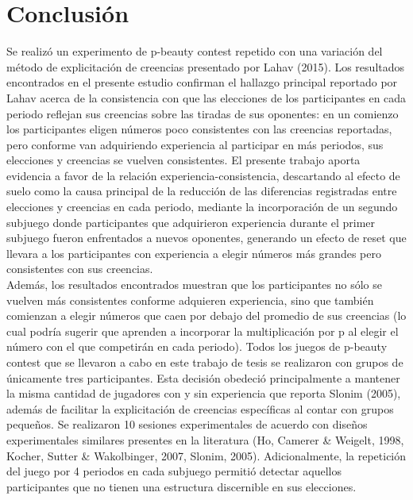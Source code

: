 
\chapter{Conclusión} %

\label{Cap_Conclusion} %
Se realizó un experimento de p-beauty contest repetido con una variación del método de explicitación de creencias presentado por Lahav (2015). Los resultados encontrados en el presente estudio confirman el hallazgo principal reportado por Lahav acerca de la consistencia con que las elecciones de los participantes en cada periodo reflejan sus creencias sobre las tiradas de sus oponentes: en un comienzo los participantes eligen números poco consistentes con las creencias reportadas, pero conforme van adquiriendo experiencia al participar en más periodos, sus elecciones y creencias se vuelven consistentes. El presente trabajo aporta evidencia a favor de la relación experiencia-consistencia, descartando al efecto de suelo como la causa principal de la reducción de las diferencias registradas entre elecciones y creencias en cada periodo, mediante la incorporación de un segundo subjuego donde participantes que adquirieron experiencia durante el primer subjuego fueron enfrentados a nuevos oponentes, generando un efecto de reset que llevara a los participantes con experiencia a elegir números más grandes pero consistentes con sus creencias.\\

Además, los resultados encontrados muestran que los participantes no sólo se vuelven más consistentes conforme adquieren experiencia, sino que también comienzan a elegir números que caen por debajo del promedio de sus creencias (lo cual podría sugerir que aprenden a incorporar la multiplicación por p al elegir el número con el que competirán en cada periodo).
Todos los juegos de p-beauty contest que se llevaron a cabo en este trabajo de tesis se realizaron con grupos de únicamente tres participantes. Esta decisión obedeció principalmente a mantener la misma cantidad de jugadores con y sin experiencia que reporta Slonim (2005), además de facilitar la explicitación de creencias específicas al contar con grupos pequeños. Se realizaron 10 sesiones experimentales de acuerdo con diseños experimentales similares presentes en la literatura (Ho, Camerer & Weigelt, 1998, Kocher, Sutter & Wakolbinger, 2007, Slonim, 2005). Adicionalmente, la repetición del juego por 4 periodos en cada subjuego permitió detectar aquellos participantes que no tienen una estructura discernible en sus elecciones.\\

